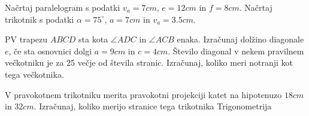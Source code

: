 \documentclass{izpit}
\begin{document}
\naloga[\tocke{8}]
  \podnaloga[4]
  Načrtaj paralelogram s podatki $v_a=7cm$, $e=12cm$ in $f=8cm$.
  \prostor[1]
  \podnaloga[4]
  Načrtaj trikotnik s podatki $\alpha =75^\circ$, $a=7cm$ in $v_a=3.5cm$.%
  \prostor[1]


  
\naloga[\tocke{8}]
  \podnaloga[4]
  PV trapezu $ABCD$ sta kota $\angle ADC$ in $\angle ACB$ enaka. Izračunaj dolžino diagonale $e$, če sta osnovnici dolgi $a=9cm$ in $c=4cm$.
  \prostor[2]
  \podnaloga[4]
  Število diagonal v nekem pravilnem večkotniku je za 25 večje od števila stranic. Izračunaj, koliko meri notranji kot tega večkotnika.
  \prostor[1]


\naloga[\tocke{8}]
  \podnaloga[4]
  V pravokotnem trikotniku merita pravokotni projekciji katet na hipotenuzo $18cm$ in $32cm$. Izračunaj, koliko merijo stranice tega trikotnika
  \prostor[1]
  \podnaloga[4]
  Trigonometrija
  \prostor[1]
\end{document}
